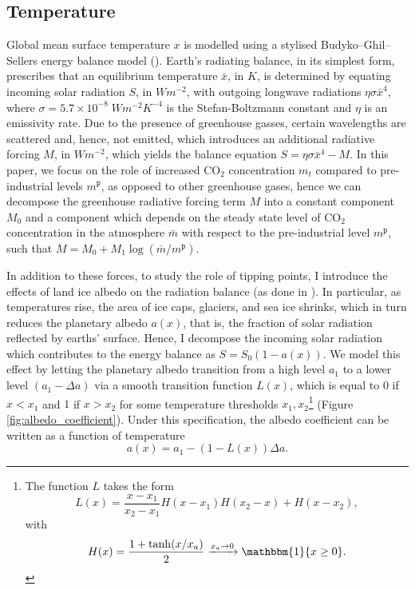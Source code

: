 \documentclass[../../main.tex]{subfiles}
\begin{document}
\subsection{Temperature}

Global mean surface temperature $x$ is modelled using a stylised Budyko–Ghil–Sellers energy balance model (\cite{hogg_glacial_2008, ashwin_extreme_2020}). Earth's radiating balance, in its simplest form, prescribes that an equilibrium temperature $\bar x$, in $\unit{K}$, is determined by equating incoming solar radiation $S$, in $\unit{W}\unit{m}^{-2}$, with outgoing longwave radiations $\eta \sigma \bar{x}^4$, where $\sigma = 5.7 \times 10^{-8} \; \unit{W} \unit{m}^{-2} \unit{K}^{-4}$ is the Stefan-Boltzmann constant and $\eta$ is an emissivity rate. Due to the presence of greenhouse gasses, certain wavelengths are scattered and, hence, not emitted, which introduces an additional radiative forcing $M$, in $\unit{W}\unit{m}^{-2}$, which yields the balance equation $S = \eta \sigma \bar{x}^4 - M$. In this paper, we focus on the role of increased CO$_2$ concentration $m_t$ compared to pre-industrial levels $m^{\mathtt{p}}$, as opposed to other greenhouse gases, hence we can decompose the greenhouse radiative forcing term $M$ into a constant component $M_0$ and a component which depends on the steady state level of CO$_2$ concentration in the atmosphere $\bar{m}$ with respect to the pre-industrial level $m^{\mathtt{p}}$, such that $M = M_0 + M_1 \log(\bar{m} / m^{\mathtt{p}})$.

In addition to these forces, to study the role of tipping points, I introduce the effects of land ice albedo on the radiation balance (as done in \cite{ghil_topics_2011,dijkstra_sensitivity_2015}). In particular, as temperatures rise, the area of ice caps, glaciers, and sea ice shrinks, which in turn reduces the planetary albedo $a(x)$, that is, the fraction of solar radiation reflected by earths' surface. Hence, I decompose the incoming solar radiation which contributes to the energy balance as $S = S_0 (1 - a(x))$. We model this effect by letting the planetary albedo transition from a high level $a_1$ to a lower level $(a_1 - \Delta a)$ via a smooth transition function $L(x)$, which is equal to $0$ if $x < x_1$ and $1$ if $x > x_2$ for some temperature thresholds $x_1, x_2$\footnote{
    The function $L$ takes the form \begin{equation}
        L(x) = \frac{x - x_1}{x_2 - x_1} H(x - x_1) H(x_2 - x) + H(x - x_2),
    \end{equation} with \begin{equation}
        H(x) = \frac{1 + \tanh(x / x_a)}{2} \xrightarrow{x_a \rightarrow 0} \mathbbm{1} \{x \geq 0\}.
    \end{equation}
} (Figure \ref{fig:albedo_coefficient}). Under this specification, the albedo coefficient can be written as a function of temperature \begin{equation} \label{eq:assumption:albedo}
    a(x) = a_1 - (1 - L(x)) \Delta a.
\end{equation} 
\end{document}
